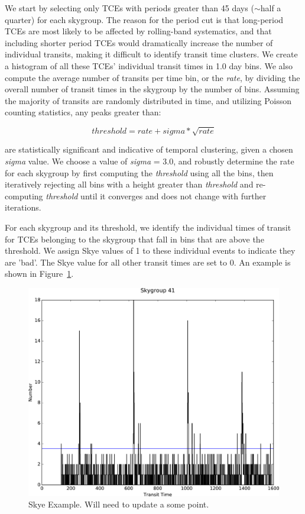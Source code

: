 
We start by selecting only TCEs with periods greater than 45 days ($\sim$half a quarter) for each skygroup. The reason for the period cut is that long-period TCEs are most likely to be affected by rolling-band systematics, and that including shorter period TCEs would dramatically increase the number of individual transits, making it difficult to identify transit time clusters. We create a histogram of all these TCEs' individual transit times in 1.0 day bins. We also compute the average number of transits per time bin, or the \emph{rate}, by dividing the overall number of transit times in the skygroup by the number of bins. Assuming the majority of transits are randomly distributed in time, and utilizing Poisson counting statistics, any peaks greater than:

\begin{equation}
threshold = rate + sigma*\sqrt{rate}
\end{equation}

\noindent are statistically significant and indicative of temporal clustering, given a chosen \emph{sigma} value. We choose a value of \emph{sigma} = 3.0, and robustly determine the rate for each skygroup by first computing the \emph{threshold} using all the bins, then iteratively rejecting all bins with a height greater than \emph{threshold} and re-computing \emph{threshold} until it converges and does not change with further iterations.

For each skygroup and its threshold, we identify the individual times of transit for TCEs belonging to the skygroup that fall in bins that are above the threshold. We assign Skye values of 1 to these individual events to indicate they are 'bad'. The Skye value for all other transit times are set to 0. An example is shown in Figure~\ref{skyefig}.

\begin{figure}[h]
\centering
\includegraphics[width=\linewidth]{Skye-Paper-Plot.png}
\caption{Skye Example. Will need to update a some point.}
\label{skyefig}
\end{figure}

